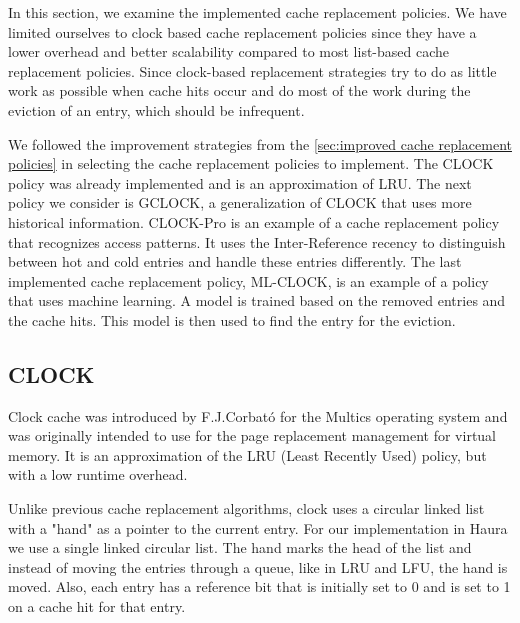 \documentclass[
	12pt,
	a4paper,
	abstract,
	bibliography=totoc,
	chapterprefix,
	headings=openright,
	numbers=endperiod,
	parskip=half,
	twoside,
]{scrreprt}
\begin{document}
In this section, we examine the implemented cache replacement policies.
We have limited ourselves to clock based cache replacement policies since they have a lower overhead 
and better scalability 
compared to most list-based cache replacement policies.
Since clock-based replacement strategies try to do as little work as possible when cache hits occur and 
do most of the work during the eviction of an entry, which should be infrequent.

We followed the improvement strategies from the \cref{sec:improved cache replacement policies}
in selecting the cache replacement policies to implement.
The CLOCK policy was already implemented and is an approximation of LRU.
The next policy we consider is GCLOCK, a generalization of CLOCK that uses more historical information.
CLOCK-Pro is an example of a cache replacement policy that recognizes access patterns.
It uses the Inter-Reference recency to distinguish between hot and cold entries and handle these entries differently.
The last implemented cache replacement policy, ML-CLOCK, is an example of a policy that uses machine learning.
A model is trained based on the removed entries and the cache hits. 
This model is then used to find the entry for the eviction.

\subsection{CLOCK}

Clock cache was introduced by F.J.Corbató \cite{corbato1968paging} for the Multics operating system and was originally intended 
to use for the page replacement management for virtual memory.
It is an approximation of the LRU (Least Recently Used) policy, but with a low runtime overhead.

Unlike previous cache replacement algorithms, clock uses a circular linked list with a "hand" as a pointer to the current entry.
For our implementation in Haura we use a single linked circular list.
The hand marks the head of the list and instead of moving the entries through a queue, like in LRU and LFU, the hand is moved.
Also, each entry has a reference bit that is initially set to 0 and is set to 1 on a cache hit for that entry.
\end{document}
